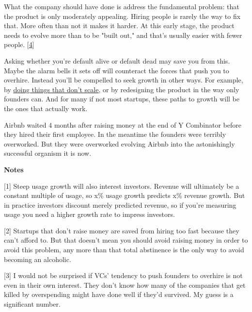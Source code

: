 What the company should have done is address
                  the fundamental problem: that the product is only moderately
                  appealing. Hiring people is rarely the way to fix that. More
                  often than not it makes it harder. At this early stage, the
                  product needs to evolve more than to be "built out," and
                  that's usually easier with fewer people.
                  [\href{\#f4n}{4}]

Asking whether you're default alive or default
                  dead may save you from this. Maybe the alarm bells it sets off
                  will counteract the forces that push you to overhire. Instead
                  you'll be compelled to seek growth in other ways. For example,
                  by \href{http://www.paulgraham.com/ds.html}{\underline{doing things that don't scale}}, or by redesigning the product in the way only founders can.
                  And for many if not most startups, these paths to growth will
                  be the ones that actually work.

Airbnb waited 4
                  months after raising money at the end of Y Combinator
                  before they hired their first employee. In the meantime the
                  founders were terribly overworked. But they were overworked
                  evolving Airbnb into the astonishingly successful organism it
                  is now.





\textbf{Notes}

[1] Steep usage growth will also interest investors. Revenue
                  will ultimately be a constant multiple of usage, so x\% usage
                  growth predicts x\% revenue growth. But in practice investors
                  discount merely predicted revenue, so if you're measuring
                  usage you need a higher growth rate to impress investors.

[2] Startups that don't raise money are saved from hiring too
                  fast because they can't afford to. But that doesn't mean you
                  should avoid raising money in order to avoid this problem, any
                  more than that total abstinence is the only way to avoid
                  becoming an alcoholic.

[3] I would not be surprised if VCs' tendency to push founders
                  to overhire is not even in their own interest. They don't know
                  how many of the companies that get killed by overspending
                  might have done well if they'd survived. My guess is a
                  significant number.

